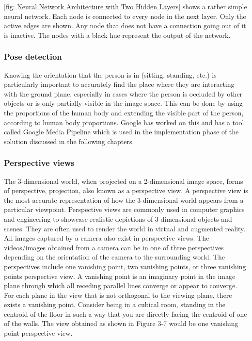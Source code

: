 \ref{fig: Neural Network Architecture with Two Hidden Layers} shows a rather simple neural network. Each node is connected to every node in the next layer. Only the active edges are shown.
Any node that does not have a connection going out of it is inactive. The nodes with a black hue represent the output of the network.\newline

\subsubsection{Pose detection}

Knowing the orientation that the person is in (sitting, standing, etc.) is particularly important to accurately find the place where they are interacting with the ground plane, especially in cases where the person is occluded by other objects or is only partially visible in the image space. This can be done by using the proportions of the human body and extending the visible part of the person, according to human body proportions. Google has worked on this and has a tool called Google Media Pipeline \cite{12} which is used in the implementation phase of the solution discussed in the following chapters. 

\subsubsection{Perspective views}

The 3-dimensional world, when projected on a 2-dimensional image space, forms of perspective, projection, also known as a perspective view. A perspective view is the most accurate representation of how the 3-dimensional world appears from a particular viewpoint. Perspective views are commonly used in computer graphics and engineering to showcase realistic depictions of 3-dimensional objects and scenes. They are often used to render the world in virtual and augmented reality. All images captured by a camera also exist in perspective views. The videos/images obtained from a camera can be in one of three perspectives depending on the orientation of the camera to the surrounding world. The perspectives include one vanishing point, two vanishing points, or three vanishing points perspective view. A vanishing point is an imaginary point in the image plane through which all receding parallel lines converge or appear to converge. For each plane in the view that is not orthogonal to the viewing plane, there exists a vanishing point. Consider being in a cubical room, standing in the centroid of the floor in such a way that you are directly facing the centroid of one of the walls. The view obtained as shown in Figure 3-7 would be one vanishing point perspective view.\newline

